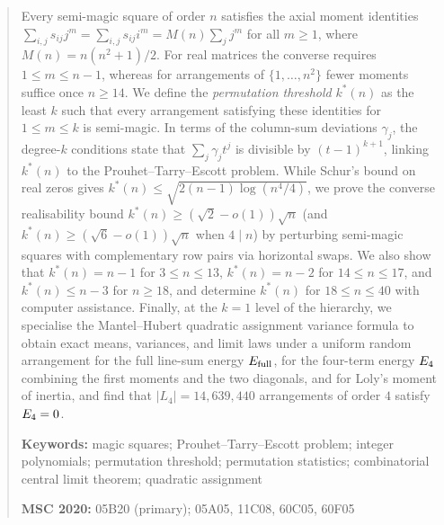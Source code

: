 \begin{abstract}
Every semi-magic square of order $n$ satisfies the axial moment identities $\sum_{i,j}s_{ij}j^m=\sum_{i,j}s_{ij}i^m=M(n)\sum_jj^m$ for all $m\ge1$, where $M(n)=n(n^2+1)/2$. For real matrices the converse requires $1\le m\le n-1$, whereas for arrangements of $\{1,\dots,n^2\}$ fewer moments suffice once $n\ge14$. We define the \emph{permutation threshold} $k^*(n)$ as the least $k$ such that every arrangement satisfying these identities for $1\le m\le k$ is semi-magic. In terms of the column-sum deviations $\gamma_j$, the degree-$k$ conditions state that $\sum_j\gamma_jt^j$ is divisible by $(t-1)^{k+1}$, linking $k^*(n)$ to the Prouhet--Tarry--Escott problem. While Schur's bound on real zeros gives $k^*(n)\le\sqrt{2(n-1)\log(n^4/4)}$, we prove the converse realisability bound $k^*(n)\ge(\sqrt2-o(1))\sqrt n$ (and $k^*(n)\ge(\sqrt6-o(1))\sqrt n$ when $4\mid n$) by perturbing semi-magic squares with complementary row pairs via horizontal swaps. We also show that $k^*(n)=n-1$ for $3\le n\le13$, $k^*(n)=n-2$ for $14\le n\le17$, and $k^*(n)\le n-3$ for $n\ge18$, and determine $k^*(n)$ for $18\le n\le40$ with computer assistance. Finally, at the $k=1$ level of the hierarchy, we specialise the Mantel--Hubert quadratic assignment variance formula to obtain exact means, variances, and limit laws under a uniform random arrangement for the full line-sum energy $\Efull$, for the four-term energy $\Efour$ combining the first moments and the two diagonals, and for Loly's moment of inertia, and find that $|L_4|=14{,}639{,}440$ arrangements of order $4$ satisfy $\Efour=0$.

\medskip
\noindent\textbf{Keywords:} magic squares; Prouhet--Tarry--Escott problem; integer polynomials; permutation threshold; permutation statistics; combinatorial central limit theorem; quadratic assignment

\noindent\textbf{MSC 2020:} 05B20 (primary); 05A05, 11C08, 60C05, 60F05
\end{abstract}
